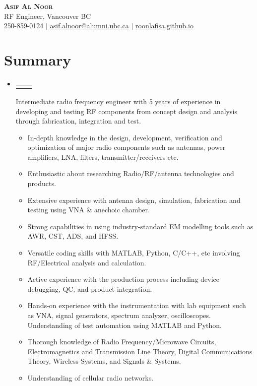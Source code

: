\documentclass[letterpaper,11pt]{article}
\makeatletter
\newcommand{\resumeItem}[1]{
  \item\small{
    {#1 \vspace{-2pt}}
  }
}
\newcommand{\resumeProjectHeading}[2]{
    \item
    \begin{tabular*}{0.97\textwidth}{l@{\extracolsep{\fill}}r}
      \small#1 & #2 \\
    \end{tabular*}\vspace{-7pt}
}
\newcommand{\resumeSubHeadingListStart}{\begin{itemize}[leftmargin=0.15in, label={}]}
\newcommand{\resumeSubHeadingListEnd}{\end{itemize}}
\newcommand{\resumeItemListStart}{\begin{itemize}}
\newcommand{\resumeItemListEnd}{\end{itemize}\vspace{-5pt}}
\makeatother
\begin{document}


\begin{center}
    \textbf{\Huge \scshape Asif Al Noor} \\ \vspace{1pt}
     \small RF Engineer, Vancouver BC \\
    \small 250-859-0124 $|$ \href{mailto:asif.alnoor@alumni.ubc.ca}{\underline{asif.alnoor@alumni.ubc.ca}} $|$ 
    \href{https://roonlafisa.github.io/}{\underline{roonlafisa.github.io}}
\end{center}

\section{Summary}

\resumeSubHeadingListStart
    \resumeProjectHeading {}{}
    Intermediate radio frequency engineer with 5 years of experience in developing and testing RF components from concept design and analysis through fabrication, integration and test.
        \resumeItemListStart
        \resumeItem{In-depth knowledge in the design, development, verification and optimization of major radio components such as antennas, power amplifiers, LNA, filters, transmitter/receivers etc.}
        \resumeItem{Enthusiastic about researching Radio/RF/antenna technologies and products.}
        \resumeItem{Extensive experience with antenna design, simulation, fabrication and testing using VNA \& anechoic chamber.}
        \resumeItem{Strong capabilities in using industry-standard EM modelling tools such as AWR, CST, ADS, and HFSS.}
        \resumeItem{Versatile coding skills with MATLAB, Python, C/C++, etc involving RF/Electrical analysis and calculation.}
        \resumeItem{Active experience with the production process including device debugging, QC, and product integration.}
        \resumeItem{Hands-on experience with the instrumentation with lab equipment such as VNA, signal generators, spectrum analyzer, oscilloscopes. Understanding of test automation using MATLAB and Python.}
        \resumeItem{Thorough knowledge of Radio Frequency/Microwave Circuits, Electromagnetics and Transmission Line Theory, Digital Communications Theory, Wireless Systems, and Signals \& Systems.}
        \resumeItem{Understanding of cellular radio networks.}
        \resumeItemListEnd
\resumeSubHeadingListEnd
\end{document}
